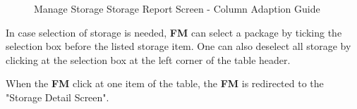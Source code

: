 \begin{figure}[H] %
	\centering
    \hspace{5pt}
    
    \vspace{10pt}
    \caption{Manage Storage Storage Report Screen - Column Adaption Guide}
	\label{fig:MSstorageReportColumnAdaption}
\end{figure}

In case selection of storage is needed, \textbf{FM} can select a package by ticking the selection box before the listed storage item. One can also deselect all storage by clicking at the selection box at the left corner of the table header.

\bigskip

When the \textbf{FM} click at one item of the table, the \textbf{FM} is redirected to the "Storage Detail Screen".

